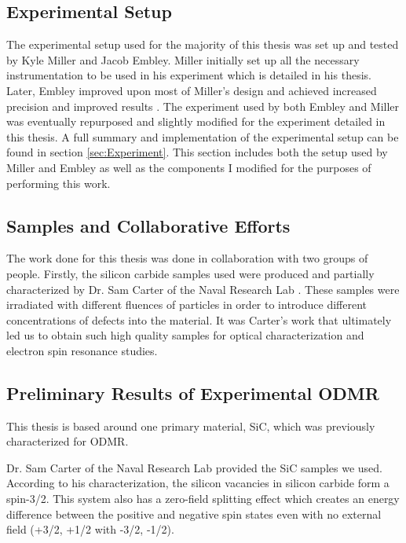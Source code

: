 \documentclass[oneside]{BYUPhys}
\begin{document}
\subsection{Experimental Setup}

The experimental setup used for the majority of this thesis was set up and tested by Kyle Miller and Jacob Embley. Miller initially set up all the necessary instrumentation to be used in his experiment which is detailed in his thesis. Later, Embley improved upon most of Miller's design and achieved increased precision and improved results \cite{RefWorks:doc:5892912ae4b0dec22aee3993}. The experiment used by both Embley and Miller was eventually repurposed and slightly modified for the experiment detailed in this thesis. A full summary and implementation of the experimental setup can be found in section \ref{sec:Experiment}. This section includes both the setup used by Miller and Embley as well as the components I modified for the purposes of performing this work.

\subsection{Samples and Collaborative Efforts}

The work done for this thesis was done in collaboration with two groups of people. Firstly, the silicon carbide samples used were produced and partially characterized by Dr. Sam Carter of the Naval Research Lab \cite{RefWorks:doc:5892964ee4b0499fa95c5108}. These samples were irradiated with different fluences of particles in order to introduce different concentrations of defects into the material. It was Carter's work that ultimately led us to obtain such high quality samples for optical characterization and electron spin resonance studies.

\subsection{Preliminary Results of Experimental ODMR}

This thesis is based around one primary material, SiC, which was previously characterized for ODMR.

Dr. Sam Carter of the Naval Research Lab provided the SiC samples we used. According to his characterization, the silicon vacancies in silicon carbide form a spin-3/2. This system also has a zero-field splitting effect which creates an energy difference between the positive and negative spin states even with no external field (+3/2, +1/2 with -3/2, -1/2).
 
\end{document}
